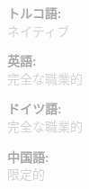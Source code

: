 \documentclass[10pt,a4paper]{article}
\begin{document}
\vspace{1pt}
\noindent
\begin{minipage}[t]{0.24\textwidth}
  \textcolor{darkgray}{\textbf{トルコ語:}} \\
  \textcolor{lightgray}{\small ネイティブ}
\end{minipage}%
\hfill
\begin{minipage}[t]{0.24\textwidth}
  \textcolor{darkgray}{\textbf{英語:}} \\
  \textcolor{lightgray}{\small 完全な職業的}
\end{minipage}%
\hfill
\begin{minipage}[t]{0.24\textwidth}
  \textcolor{darkgray}{\textbf{ドイツ語:}} \\
  \textcolor{lightgray}{\small 完全な職業的}
\end{minipage}%
\hfill
\begin{minipage}[t]{0.24\textwidth}
  \textcolor{darkgray}{\textbf{中国語:}} \\
  \textcolor{lightgray}{\small 限定的}
\end{minipage}
\end{document}
